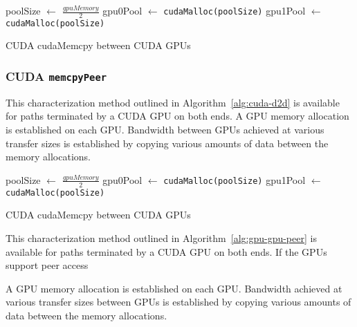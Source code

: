 \begin{algorithm}[ht]
    \SetAlgoLined
    poolSize $\gets$ $\frac{gpuMemory}{2}$\;
    gpu0Pool $\gets$ \texttt{cudaMalloc(poolSize)}\;
    gpu1Pool $\gets$ \texttt{cudaMalloc(poolSize)}\;
    \caption{CUDA cudaMemcpy between CUDA GPUs}
    \label{alg:cuda-d2d}
\end{algorithm}

\subsubsection{CUDA \texttt{memcpyPeer}}

This characterization method outlined in Algorithm~\ref{alg:cuda-d2d} is available for paths terminated by a CUDA GPU on both ends.
A GPU memory allocation is established on each GPU.
Bandwidth between GPUs achieved at various transfer sizes is established by copying various amounts of data between the memory allocations.

\begin{algorithm}[ht]
    \SetAlgoLined
    poolSize $\gets$ $\frac{gpuMemory}{2}$\;
    gpu0Pool $\gets$ \texttt{cudaMalloc(poolSize)}\;
    gpu1Pool $\gets$ \texttt{cudaMalloc(poolSize)}\;
    \caption{CUDA cudaMemcpy between CUDA GPUs}
    \label{alg:cuda-p2p}
\end{algorithm}


This characterization method outlined in Algorithm~\ref{alg:gpu-gpu-peer} is available for paths terminated by a CUDA GPU on both ends.
If the GPUs support peer access

A GPU memory allocation is established on each GPU.
Bandwidth achieved at various transfer sizes between GPUs is established by copying various amounts of data between the memory allocations.


